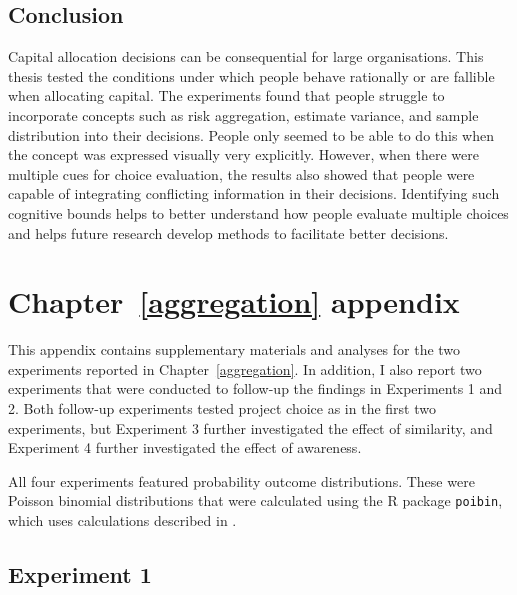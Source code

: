 \documentclass[a4paper, nobind, dvipsnames]{templates/ociamthesis}
\theoremstyle{definition}
\theoremstyle{definition}
\theoremstyle{definition}
\theoremstyle{definition}
\theoremstyle{remark}
\begin{document}
\hypertarget{conclusion}{%
\section{Conclusion}\label{conclusion}}

Capital allocation decisions can be consequential for large organisations. This
thesis tested the conditions under which people behave rationally or are
fallible when allocating capital. The experiments found that people struggle to
incorporate concepts such as risk aggregation, estimate variance, and sample
distribution into their decisions. People only seemed to be able to do this when
the concept was expressed visually very explicitly. However, when there were
multiple cues for choice evaluation, the results also showed that people were
capable of integrating conflicting information in their decisions. Identifying
such cognitive bounds helps to better understand how people evaluate multiple
choices and helps future research develop methods to facilitate better
decisions.

\newpage

\printbibliography[segment=\therefsegment,heading=subbibintoc]

\appendix


\hypertarget{aggregation-appendix}{%
\chapter{Chapter~\ref{aggregation} appendix}\label{aggregation-appendix}}

\minitoc

This appendix contains supplementary materials and analyses for the two
experiments reported in Chapter~\ref{aggregation}. In addition, I also report
two experiments that were conducted to follow-up the findings in Experiments 1
and 2. Both follow-up experiments tested project choice as in the first two
experiments, but Experiment 3 further investigated the effect of similarity, and
Experiment 4 further investigated the effect of awareness.

All four experiments featured probability outcome distributions. These were
Poisson binomial distributions that were calculated using the R package
\texttt{poibin}, which uses calculations described in \textcite{hong2013}.

\section{Experiment 1}
\end{document}
